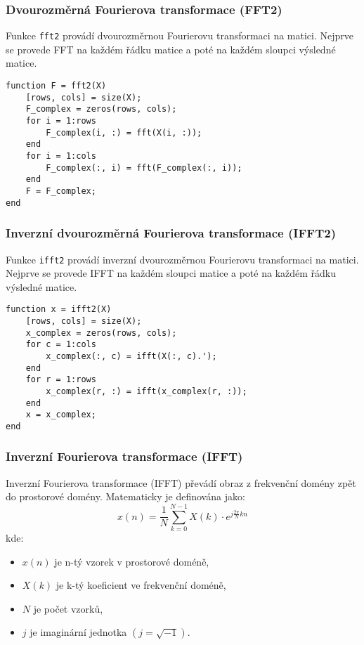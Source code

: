 \subsubsection{Dvourozměrná Fourierova transformace (FFT2)}
Funkce \texttt{fft2} provádí dvourozměrnou Fourierovu transformaci na matici. Nejprve se provede FFT na každém řádku matice a poté na každém sloupci výsledné matice.
\newpage
\begin{verbatim}
function F = fft2(X)
    [rows, cols] = size(X);
    F_complex = zeros(rows, cols);
    for i = 1:rows
        F_complex(i, :) = fft(X(i, :));
    end
    for i = 1:cols
        F_complex(:, i) = fft(F_complex(:, i));
    end
    F = F_complex;
end
\end{verbatim}

\subsubsection{Inverzní dvourozměrná Fourierova transformace (IFFT2)}
Funkce \texttt{ifft2} provádí inverzní dvourozměrnou Fourierovu transformaci na matici. Nejprve se provede IFFT na každém sloupci matice a poté na každém řádku výsledné matice.

\begin{verbatim}
function x = ifft2(X)
    [rows, cols] = size(X);
    x_complex = zeros(rows, cols);
    for c = 1:cols
        x_complex(:, c) = ifft(X(:, c).');
    end
    for r = 1:rows
        x_complex(r, :) = ifft(x_complex(r, :));
    end
    x = x_complex;
end
\end{verbatim}

\subsubsection{Inverzní Fourierova transformace (IFFT)}
Inverzní Fourierova transformace (IFFT) převádí obraz z frekvenční domény zpět do prostorové domény. Matematicky je definována jako:
\[
x(n) = \frac{1}{N} \sum_{k=0}^{N-1} X(k) \cdot e^{j \frac{2\pi}{N} kn}
\]
kde:
\begin{itemize}
    \item \( x(n) \) je n-tý vzorek v prostorové doméně,
    \item \( X(k) \) je k-tý koeficient ve frekvenční doméně,
    \item \( N \) je počet vzorků,
    \item \( j \) je imaginární jednotka \((j = \sqrt{-1})\).
\end{itemize}


